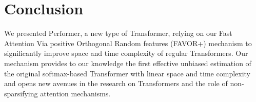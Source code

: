 \vspace{-3mm}
\section{Conclusion}
\label{sec:conclusion}
We presented $\mathrm{Performer}$, a new type of Transformer, relying on our Fast Attention Via positive Orthogonal Random features (FAVOR+) mechanism to significantly improve space and time complexity of regular Transformers. Our mechanism provides to our knowledge the first effective unbiased estimation of the original softmax-based Transformer with linear space and time complexity and opens new avenues in the research on Transformers and the role of non-sparsifying attention mechanisms.



